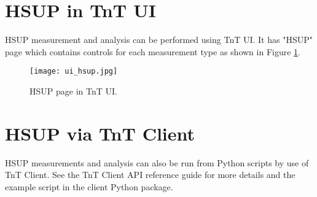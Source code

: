 \section{HSUP in TnT UI}

HSUP measurement and analysis can be performed using TnT UI. It has "HSUP" page which contains controls for each measurement type as shown in Figure \ref{fig:ui_hsup}.

\begin{figure}[h]
	\centering
	\texttt{[image: ui\_hsup.jpg]}
	\caption{HSUP page in TnT UI.}
	\label{fig:ui_hsup}
\end{figure}









\section{HSUP via TnT Client}

HSUP measurements and analysis can also be run from Python scripts by use of TnT Client. See the TnT Client API reference guide for more details and the example script in the client Python package.

